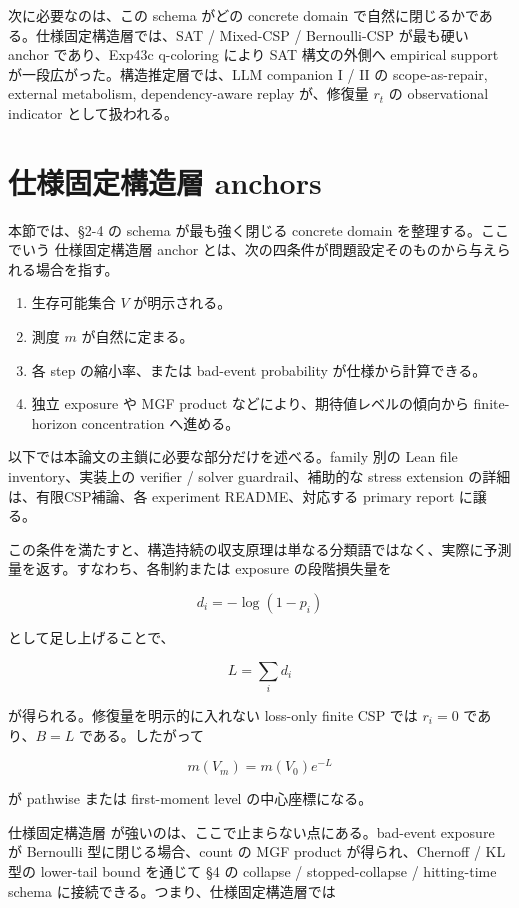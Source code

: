 \documentclass[12pt,a4paper]{article}
\begin{document}
次に必要なのは、この schema がどの concrete domain で自然に閉じるかである。仕様固定構造層では、SAT / Mixed-CSP / Bernoulli-CSP が最も硬い anchor であり、Exp43c q-coloring により SAT 構文の外側へ empirical support が一段広がった。構造推定層では、LLM companion I / II の scope-as-repair, external metabolism, dependency-aware replay が、修復量 \(r_{t}\) の observational indicator として扱われる。

\section{仕様固定構造層 anchors}\label{ux4ed5ux69d8ux56faux5b9aux69cbux9020ux5c64-anchors}

本節では、§2-4 の schema が最も強く閉じる concrete domain を整理する。ここでいう 仕様固定構造層 anchor とは、次の四条件が問題設定そのものから与えられる場合を指す。

\begin{enumerate}
\def\labelenumi{\arabic{enumi}.}
\tightlist
\item
  生存可能集合 \(V\) が明示される。
\item
  測度 \(m\) が自然に定まる。
\item
  各 step の縮小率、または bad-event probability が仕様から計算できる。
\item
  独立 exposure や MGF product などにより、期待値レベルの傾向から finite-horizon concentration へ進める。
\end{enumerate}

以下では本論文の主鎖に必要な部分だけを述べる。family 別の Lean file inventory、実装上の verifier / solver guardrail、補助的な stress extension の詳細は、有限CSP補論、各 experiment README、対応する primary report に譲る。

この条件を満たすと、構造持続の収支原理は単なる分類語ではなく、実際に予測量を返す。すなわち、各制約または exposure の段階損失量を

\[
d_{i} = -\log(1-p_{i})
\]

として足し上げることで、

\[
L = \sum_{i} d_{i}
\]

が得られる。修復量を明示的に入れない loss-only finite CSP では \(r_{i}=0\) であり、\(B=L\) である。したがって

\[
m(V_{m}) = m(V_0)e^{-L}
\]

が pathwise または first-moment level の中心座標になる。

仕様固定構造層 が強いのは、ここで止まらない点にある。bad-event exposure が Bernoulli 型に閉じる場合、count の MGF product が得られ、Chernoff / KL 型の lower-tail bound を通じて §4 の collapse / stopped-collapse / hitting-time schema に接続できる。つまり、仕様固定構造層では
\end{document}
